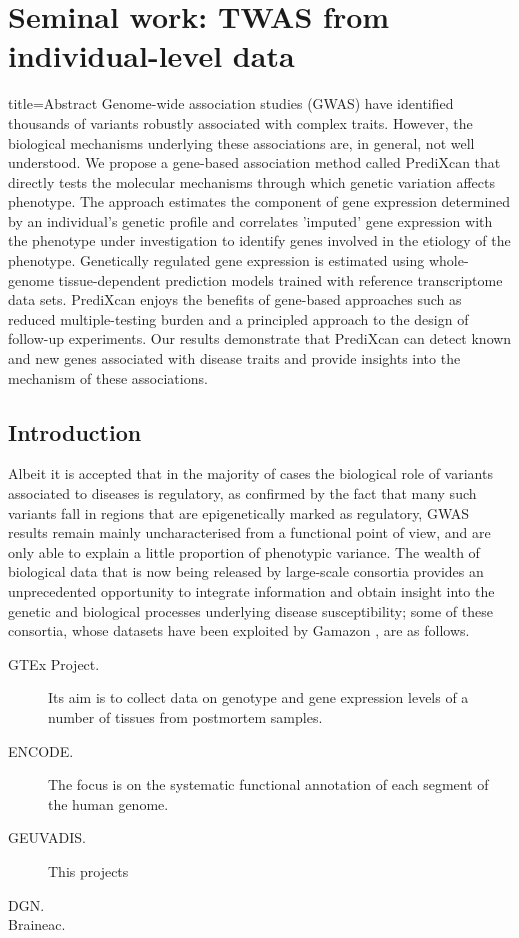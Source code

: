 \documentclass[../main.tex]{subfiles}
\begin{document}
\chapter{Seminal work: TWAS from individual-level data}

\begin{external_abstract}{title=Abstract}
Genome-wide association studies (GWAS) have identified thousands of 
variants robustly associated with complex traits. However, the 
biological mechanisms underlying these associations are, in general, not 
well understood. We propose a gene-based association method called 
PrediXcan that directly tests the molecular mechanisms through which 
genetic variation affects phenotype. The approach estimates the 
component of gene expression determined by an individual's genetic 
profile and correlates 'imputed' gene expression with the phenotype 
under investigation to identify genes involved in the etiology of the 
phenotype. Genetically regulated gene expression is estimated using 
whole-genome tissue-dependent prediction models trained with reference 
transcriptome data sets. PrediXcan enjoys the benefits of gene-based 
approaches such as reduced multiple-testing burden and a principled 
approach to the design of follow-up experiments. Our results demonstrate 
that PrediXcan can detect known and new genes associated with disease 
traits and provide insights into the mechanism of these associations.
\end{external_abstract}

\section{Introduction}

Albeit it is accepted that in the majority of cases the biological role 
of variants associated to diseases is regulatory, as confirmed by the 
fact that many such variants fall in regions that are epigenetically 
marked as regulatory, GWAS results remain mainly uncharacterised from a 
functional point of view, and are only able to explain a little 
proportion of phenotypic variance. The wealth of biological data that is 
now being released by large-scale consortia provides an unprecedented 
opportunity to integrate information and obtain insight into the genetic 
and biological processes underlying disease susceptibility; some of 
these consortia, whose datasets have been exploited by Gamazon \etal, 
are as follows.

\begin{description}
	\item[GTEx Project.] Its aim is to collect data on genotype and gene 
		expression levels of a number of tissues from postmortem 
		samples.
	\item[ENCODE.] The focus is on the systematic functional annotation 
		of each segment of the human genome.
	\item[GEUVADIS.] This projects
	\item[DGN.]
	\item[Braineac.]
\end{description}
\end{document}
